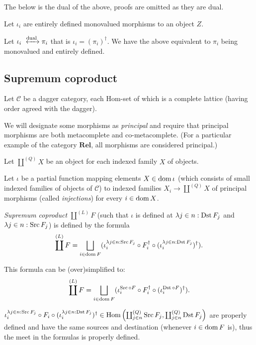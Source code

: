 The below is the dual of the above, proofs are omitted as they are dual.

Let $\iota_i$  are entirely defined monovalued morphisms to an object $Z$.

Let $\iota_i \xleftrightarrow{\dual} \pi_i$ that is $\iota_i =
(\pi_i)^{\dagger}$. We have the above equivalent to $\pi_i$ being monovalued
and entirely defined.

\subsection{Supremum coproduct}

Let $\mathcal{C}$ be a dagger category, each Hom-set of which is a complete
lattice (having order agreed with the dagger).

We will designate some morphisms as \emph{principal} and require that
principal morphisms are both metacomplete and co-metacomplete. (For a
particular example of the category $\mathbf{Rel}$, all morphisms are
considered principal.)

Let $\coprod^{(Q)} X$ be an object for each indexed family $X$ of objects.

Let $\iota$ be a partial function mapping elements $X \in \operatorname{dom} \iota$
(which consists of small indexed families of objects of $\mathcal{C}$) to
indexed families $X_i \rightarrow \coprod^{(Q)} X$ of principal morphisms
(called \emph{injections}) for every $i \in \operatorname{dom} X$.

\begin{defn}
  \emph{Supremum coproduct} $\coprod^{(L)} F$ (such that $\iota$ is defined
  at $\lambda j \in n : \operatorname{Dst} F_j$ and $\lambda j \in n : \operatorname{Src}
  F_j$) is defined by the formula
  \[ \coprod^{(L)} F = \bigsqcup_{i \in \dom F} (\iota^{\lambda j \in n
     : \Src F_j}_i \circ F_i^{\dagger} \circ (\iota^{\lambda j \in n :
     \Dst F_j}_i)^{\dagger}) . \]
\end{defn}

This formula can be (over)simplified to:
\[ \coprod^{(L)} F = \bigsqcup_{i \in \dom F} (\iota^{\Src \circ
   F}_i \circ F_i^{\dagger} \circ (\iota^{\Dst \circ F}_i)^{\dagger}) .
\]

\begin{rem}
  $\iota^{\lambda j \in n : \operatorname{Src} F_j}_i \circ F_i \circ (\iota^{\lambda
  j \in n : \operatorname{Dst} F_j}_i)^{\dagger} \in \operatorname{Hom} \left(
  \coprod^{(Q)}_{j \in n} \operatorname{Src} F_j , \coprod^{(Q)}_{j \in n} \operatorname{Dst}
  F_j \right)$ are properly defined and have the same sources and destination
  (whenever $i \in \operatorname{dom} F$ is), thus the meet in the formulas is
  properly defined.
\end{rem}

